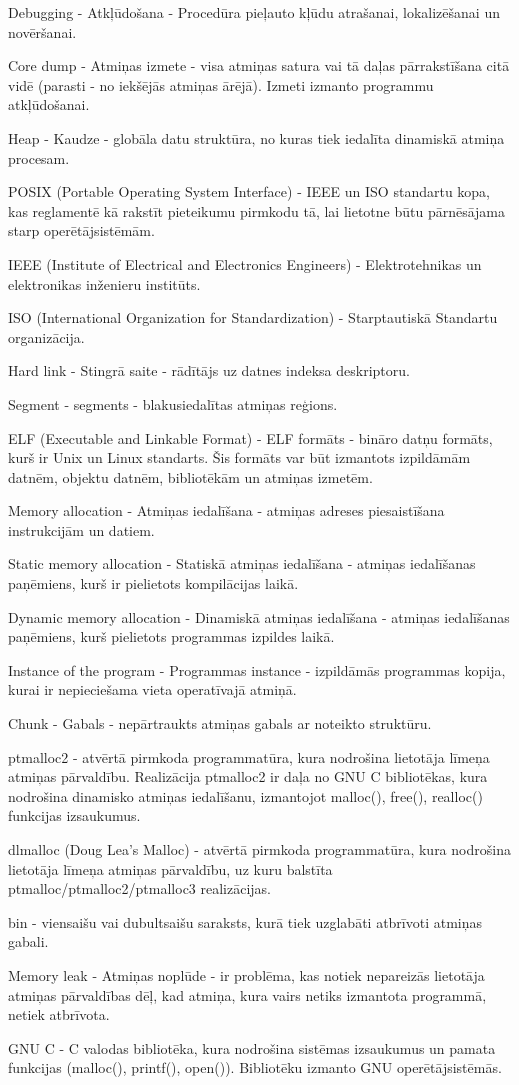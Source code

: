 \noindent 

Debugging - Atkļūdošana - Procedūra pieļauto kļūdu atrašanai, lokalizēšanai un novēršanai.

Core dump - Atmiņas izmete - visa atmiņas satura vai tā daļas pārrakstīšana citā vidē (parasti - no iekšējās atmiņas ārējā). 
Izmeti izmanto programmu atkļūdošanai.

Heap - Kaudze - globāla datu struktūra,  no kuras tiek iedalīta dinamiskā atmiņa procesam.

POSIX (Portable Operating System Interface) - IEEE un ISO standartu kopa,  kas reglamentē kā rakstīt pieteikumu pirmkodu tā, lai lietotne būtu pārnēsājama starp operētājsistēmām.

IEEE (Institute of Electrical and Electronics Engineers) - Elektrotehnikas un elektronikas inženieru institūts.

ISO (International Organization for Standardization) - Starptautiskā Standartu organizācija.

Hard link - Stingrā saite - rādītājs uz datnes indeksa deskriptoru. 

Segment - segments - blakusiedalītas atmiņas reģions.

ELF (Executable and Linkable Format) - ELF formāts -  bināro datņu formāts, kurš ir Unix un Linux standarts. Šis formāts var būt izmantots izpildāmām datnēm, objektu datnēm, bibliotēkām un atmiņas izmetēm.

Memory allocation - Atmiņas iedalīšana - atmiņas adreses piesaistīšana instrukcijām un datiem.

Static memory allocation - Statiskā atmiņas iedalīšana -  atmiņas iedalīšanas paņēmiens, kurš ir pielietots kompilācijas laikā.

Dynamic memory allocation - Dinamiskā atmiņas iedalīšana - atmiņas iedalīšanas paņēmiens, kurš pielietots programmas izpildes laikā. 

Instance of the program - Programmas instance - izpildāmās programmas kopija, kurai ir nepieciešama vieta operatīvajā atmiņā.

Chunk - Gabals - nepārtraukts atmiņas gabals ar noteikto struktūru.

ptmalloc2 - atvērtā pirmkoda programmatūra, kura nodrošina lietotāja līmeņa atmiņas pārvaldību. Realizācija ptmalloc2 ir daļa no GNU C bibliotēkas, kura nodrošina dinamisko atmiņas iedalīšanu, izmantojot malloc(), free(), realloc() funkcijas izsaukumus.

dlmalloc (Doug Lea's Malloc) - atvērtā pirmkoda programmatūra, kura nodrošina lietotāja līmeņa atmiņas pārvaldību, uz kuru balstīta ptmalloc/ptmalloc2/ptmalloc3 realizācijas.

bin - viensaišu vai dubultsaišu saraksts, kurā tiek uzglabāti atbrīvoti atmiņas gabali.

Memory leak - Atmiņas noplūde - ir problēma, kas notiek nepareizās lietotāja atmiņas pārvaldības dēļ, kad atmiņa, kura vairs netiks izmantota programmā, netiek atbrīvota.

GNU C - C valodas bibliotēka, kura nodrošina sistēmas izsaukumus un pamata funkcijas (malloc(), printf(), open()). Bibliotēku izmanto GNU operētājsistēmās.
